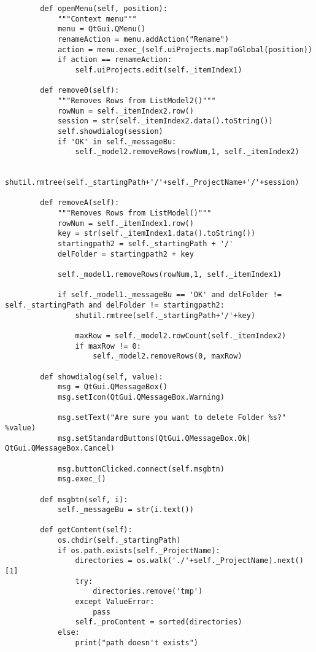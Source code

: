 \begin{verbatim}
        def openMenu(self, position):
            """Context menu"""
            menu = QtGui.QMenu()
            renameAction = menu.addAction("Rename")
            action = menu.exec_(self.uiProjects.mapToGlobal(position))
            if action == renameAction:
                self.uiProjects.edit(self._itemIndex1)
    
        def remove0(self):
            """Removes Rows from ListModel2()"""
            rowNum = self._itemIndex2.row()
            session = str(self._itemIndex2.data().toString())
            self.showdialog(session)
            if 'OK' in self._messageBu:
                self._model2.removeRows(rowNum,1, self._itemIndex2)
    
                shutil.rmtree(self._startingPath+'/'+self._ProjectName+'/'+session)
    
        def removeA(self):
            """Removes Rows from ListModel()"""
            rowNum = self._itemIndex1.row()
            key = str(self._itemIndex1.data().toString())
            startingpath2 = self._startingPath + '/'
            delFolder = startingpath2 + key
    
            self._model1.removeRows(rowNum,1, self._itemIndex1)
    
            if self._model1._messageBu == 'OK' and delFolder != self._startingPath and delFolder != startingpath2:
                shutil.rmtree(self._startingPath+'/'+key)
    
                maxRow = self._model2.rowCount(self._itemIndex2)
                if maxRow != 0:
                    self._model2.removeRows(0, maxRow)
    
        def showdialog(self, value):
            msg = QtGui.QMessageBox()
            msg.setIcon(QtGui.QMessageBox.Warning)
    
            msg.setText("Are sure you want to delete Folder %s?" %value)
            msg.setStandardButtons(QtGui.QMessageBox.Ok| QtGui.QMessageBox.Cancel)
    
            msg.buttonClicked.connect(self.msgbtn)
            msg.exec_()
    
        def msgbtn(self, i):
            self._messageBu = str(i.text())
    
        def getContent(self):
            os.chdir(self._startingPath)
            if os.path.exists(self._ProjectName):
                directories = os.walk('./'+self._ProjectName).next()[1]
                try:
                    directories.remove('tmp') 
                except ValueError:
                    pass
                self._proContent = sorted(directories)
            else:
                print("path doesn't exists")
    

\end{verbatim}
